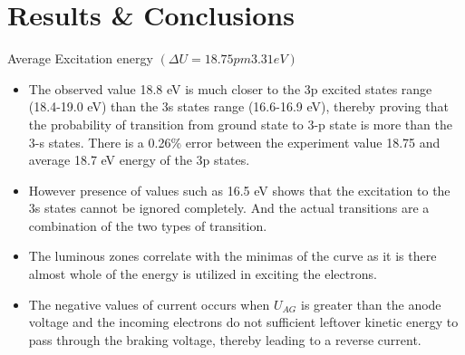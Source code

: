 \section{Results \& Conclusions}
	Average Excitation energy $(\Delta U = 18.75 pm 3.31 eV)$

	\begin{itemize}
		\item The observed value 18.8 eV is much closer to the 3p excited states range (18.4-19.0 eV) than the 3s states range (16.6-16.9 eV), thereby proving that the probability of transition from ground state to 3-p state is more than the 3-s states. There is a 0.26\% error between the experiment value 18.75 and average 18.7 eV energy of the 3p states.
		\item However presence of values such as 16.5 eV shows that the excitation to the 3s states cannot be ignored completely. And the actual transitions are a combination of the two types of transition.
		\item The luminous zones correlate with the minimas of the curve as it is there almost whole of the energy is utilized in exciting the electrons.
		\item The negative values of current occurs when $U_{AG}$ is greater than the anode voltage and the incoming electrons do not sufficient leftover kinetic energy to pass through the braking voltage, thereby leading to a reverse current.
	\end{itemize}
